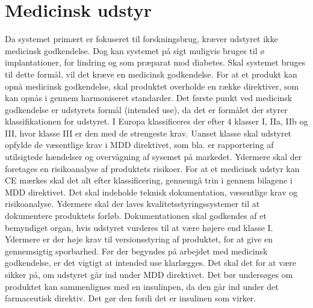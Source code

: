 \section{Medicinsk udstyr}
 Da systemet primært er fokuseret til forskningsbrug, kræver udstyret ikke medicinsk godkendelse. Dog kan systemet på sigt muligvis bruges til ø implantationer, for lindring og som præparat mod diabetes. Skal systemet bruges til dette formål, vil det kræve en medicinsk godkendelse. For at et produkt kan opnå medicinsk godkendelse, skal produktet overholde en række direktiver, som kan opnås i gennem harmoniseret standarder. Det første punkt ved medicinsk godkendelse er udstyrets formål (intended use), da det er formålet der styrer klassifikationen for udstyret. I Europa klassificeres der efter 4 klasser I, IIa, IIb og III, hvor klasse III er den med de strengeste krav. Uanset klasse skal udstyret opfylde de væsentlige krav i MDD direktivet, som bla. er rapportering af utilsigtede hændelser og overvågning af sysemet på markedet. Ydermere skal der foretages en risikoanalyse af produktets risikoer. For at et medicinsk udstyr kan CE mærkes skal det alt efter klassificering, gennemgå trin i gennem bilagene i MDD direktivet. Det skal indeholde teknisk dokumentation, væsentlige krav og risikoanalyse. Ydermere skal der laves kvalitetsstyringssystemer til at dokumentere produktets forløb. Dokumentationen skal godkendes af et bemyndiget organ, hvis udstyret vurderes til at være højere end klasse I. Ydermere er der høje krav til versionsstyring af produktet, for at give en gennemsigtig sporbarhed. Før der begyndes på arbejdet med medicinsk godkendelse, er det vigtigt at intended use klarlægges. Det skal det for at være sikker på, om udstyret går ind under MDD direktivet. Det bør undersøges om produktet kan sammenlignes med en insulinpen, da den går ind under det farmaceutisk direktiv. Det gør den fordi det er insulinen som virker. 